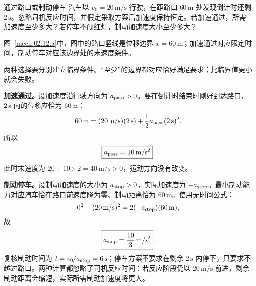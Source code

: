 {\begin{origexamplebox}{通过路口或制动停车}\label{ch02:ex:k02-2-12}
汽车以 $v_0=20\,\mathrm{m/s}$ 行驶，在距路口 $60\,\mathrm m$ 处发现倒计时还剩 $2\,\mathrm s$。忽略司机反应时间，并假定采取方案后加速度保持恒定。若加速通过，所需加速度至少多大？若停车不闯红灯，制动加速度大小至少多大？

\begin{qualityfigure}
\label{mech:02:12:q}
\end{qualityfigure}
\end{origexamplebox}
\begin{xesolution}
\begin{qualityfigure}
\label{mech:02:12:a}
\end{qualityfigure}
图~\ref{mech:02:12:a}中，图中的路口竖线是位移边界 $x=60\,\mathrm m$；加速通过对应限定时间，制动停车对应该边界处的末速度条件。

两种选择要分别建立临界条件。“至少”的边界都对应恰好满足要求；比临界值更小就会失败。

\textbf{加速通过。}设加速度沿行驶方向为 $a_{\rm pass}>0$。要在倒计时结束时刚好到达路口，$2\,\mathrm s$ 内的位移应恰为 $60\,\mathrm m$：
\[
60\,\mathrm m=(20\,\mathrm{m/s})(2\,\mathrm s)
+\frac12a_{\rm pass}(2\,\mathrm s)^2.
\]
所以
\[
\boxed{a_{\rm pass}=10\,\mathrm{m/s^2}}.
\]
此时末速度为 $20+10\times2=40\,\mathrm{m/s}>0$，运动方向没有改变。

\textbf{制动停车。}设制动加速度的大小为 $a_{\rm stop}>0$，实际加速度为 $-a_{\rm stop}$。最小制动能力对应汽车恰在路口前速度降为零、制动距离恰为 $60\,\mathrm m$。使用无时间公式：
\[
0^2-(20\,\mathrm{m/s})^2
=2(-a_{\rm stop})(60\,\mathrm m),
\]
故
\[
\boxed{a_{\rm stop}=\frac{10}{3}\,\mathrm{m/s^2}}.
\]
复核制动时间为 $t=v_0/a_{\rm stop}=6\,\mathrm s$；停车方案不要求在剩余 $2\,\mathrm s$ 内停下，只要求不越过路口。两种计算都忽略了司机反应时间：若反应阶段仍以 $20\,\mathrm{m/s}$ 前进，剩余制动距离会缩短，实际所需制动加速度将更大。
\end{xesolution}

}
